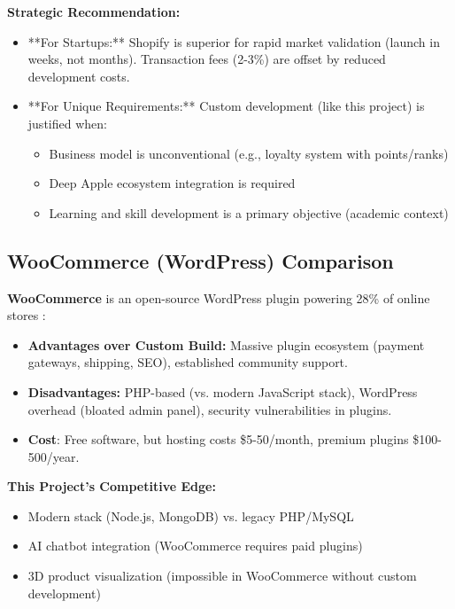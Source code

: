 \documentclass[12pt, a4paper]{report}
\begin{document}
\textbf{Strategic Recommendation:} 
\begin{itemize}
    \item **For Startups:** Shopify is superior for rapid market validation (launch in weeks, not months). Transaction fees (2-3\%) are offset by reduced development costs.
    \item **For Unique Requirements:** Custom development (like this project) is justified when:
    \begin{itemize}
        \item Business model is unconventional (e.g., loyalty system with points/ranks)
        \item Deep Apple ecosystem integration is required
        \item Learning and skill development is a primary objective (academic context)
    \end{itemize}
\end{itemize}

\subsection{WooCommerce (WordPress) Comparison}

\textbf{WooCommerce} is an open-source WordPress plugin powering 28\% of online stores \cite{woocommerce2024}:

\begin{itemize}
    \item \textbf{Advantages over Custom Build:} Massive plugin ecosystem (payment gateways, shipping, SEO), established community support.
    \item \textbf{Disadvantages:} PHP-based (vs. modern JavaScript stack), WordPress overhead (bloated admin panel), security vulnerabilities in plugins.
    \item \textbf{Cost}: Free software, but hosting costs \$5-50/month, premium plugins \$100-500/year.
\end{itemize}

\textbf{This Project's Competitive Edge:}
\begin{itemize}
    \item Modern stack (Node.js, MongoDB) vs. legacy PHP/MySQL
    \item AI chatbot integration (WooCommerce requires paid plugins)
    \item 3D product visualization (impossible in WooCommerce without custom development)
\end{itemize}
\end{document}
